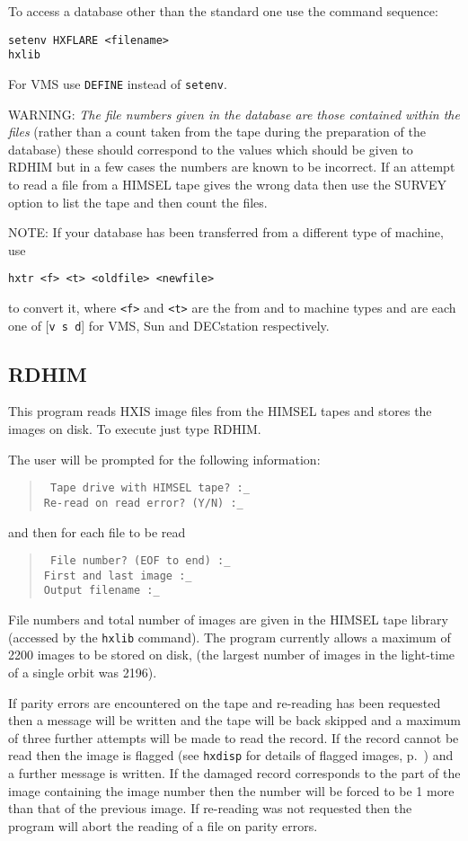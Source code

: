 To access a database other than the standard one use the command
sequence:
\begin{verbatim}
setenv HXFLARE <filename>
hxlib
\end{verbatim}
For VMS use \verb!DEFINE! instead of \verb!setenv!.

WARNING: {\em The file numbers given in the database are those
contained within the files} (rather than a count taken from the tape
during the preparation of the database) these should correspond to the
values which should be given to RDHIM but in a few cases the numbers
are known to be incorrect. If an attempt to read a file from a HIMSEL
tape gives the wrong data then use the SURVEY option to list the tape
and then count the files.

NOTE: If your database has been transferred from a different type of
machine, use
\begin{verbatim}
hxtr <f> <t> <oldfile> <newfile>
\end{verbatim}
to convert it,
where \verb!<f>! and \verb!<t>! are the from and to machine types and
are each one of [\verb!v s d!] for VMS, Sun and DECstation respectively.

\subsection{RDHIM}
\label{RDHIM}

This program reads HXIS image files from the HIMSEL tapes and stores
the images on disk. To execute just type RDHIM.

The user will be prompted for the following information:
\begin{quote} \tt
Tape drive with HIMSEL tape? :\_\\ 
Re-read on read error? (Y/N) :\_
\end{quote}
and then for each file to be read
\begin{quote} \tt
File number? (EOF to end) :\_\\ 
First and last image :\_ \\ 
Output filename :\_
\end{quote}

File numbers and total number of images are given in the HIMSEL tape
library (accessed by the \verb!hxlib! command). The program currently
allows a maximum of 2200 images to be stored on disk, (the largest
number of images in the light-time of a single orbit was 2196).

If parity errors are encountered on the tape and re-reading has been
requested then a message will be written and the tape will be back
skipped and a maximum of three further attempts will be made to read
the record. If the record cannot be read then the image is flagged (see
\verb!hxdisp! for details of flagged images, p.~\pageref{fl}) and a
further message is written. If the damaged record corresponds to the
part of the image containing the image number then the number will be
forced to be 1 more than that of the previous image. If re-reading was
not requested then the program will abort the reading of a file on
parity errors.

